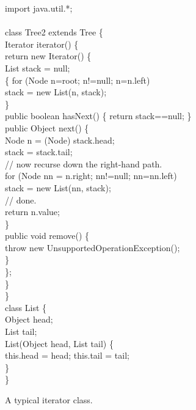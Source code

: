 \documentclass[11pt,notitlepage]{article}
\begin{document}
\begin{myfigure}\small
\begin{samplecode}
import java.util.*;\\
\\
class Tree2 extends Tree \{\\
\>Iterator iterator() \{\\
\>\>return new Iterator() \{\\
\>\>\>List stack = null;\\
\>\>\>\{ for (Node n=root; n!=null; n=n.left)\\
\>\>\>\>stack = new List(n, stack);\\
\>\>\>\}\\
\>\>\>public boolean hasNext() \{ return stack==null; \}\\
\>\>\>public Object next() \{\\
\>\>\>\>Node n = (Node) stack.head;\\
\>\>\>\>stack = stack.tail;\\
\>\>\>\>// now recurse down the right-hand path.\\
\>\>\>\>for (Node nn = n.right; nn!=null; nn=nn.left)\\
\>\>\>\>\>stack = new List(nn, stack);\\
\>\>\>\>// done.\\
\>\>\>\>return n.value;\\
\>\>\>\}\\
\>\>\>public void remove() \{\\
\>\>\>\>throw new UnsupportedOperationException();\\
\>\>\>\}\\
\>\>\};\\
\>\}\\
\}\\
class List \{\\
\>Object head;\\
\>List tail;\\
\>List(Object head, List tail) \{\\
\>\>this.head = head; this.tail = tail;\\
\>\}\\
\}\\
\end{samplecode}
\caption{A typical iterator class.}
\label{fig:iterator}
\end{myfigure}
\end{document}

